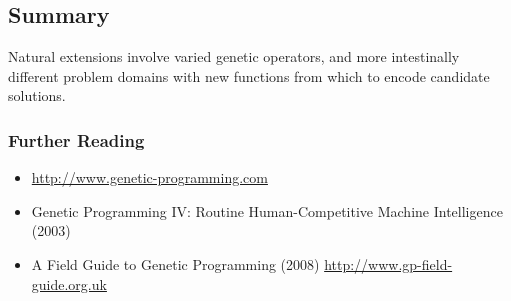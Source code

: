 \subsection{Summary}
Natural extensions involve varied genetic operators, and more intestinally different problem domains with new functions from which to encode candidate solutions.

\subsubsection{Further Reading}

\begin{itemize}
	\item \url{http://www.genetic-programming.com}
	\item Genetic Programming IV: Routine Human-Competitive Machine Intelligence (2003)
	\item A Field Guide to Genetic Programming (2008) \url{http://www.gp-field-guide.org.uk}
\end{itemize}